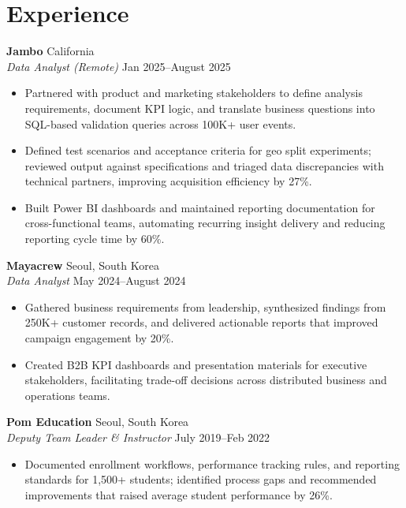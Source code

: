 \documentclass[11pt,a4paper]{article}
\begin{document}
\section*{Experience}
\noindent
\textbf{Jambo} \hfill California \\
\textit{Data Analyst (Remote)} \hfill Jan 2025--August 2025
\begin{itemize}[leftmargin=*, noitemsep, topsep=0pt]
    \item Partnered with product and marketing stakeholders to define analysis requirements, document KPI logic, and translate business questions into SQL-based validation queries across 100K+ user events.
    \item Defined test scenarios and acceptance criteria for geo split experiments; reviewed output against specifications and triaged data discrepancies with technical partners, improving acquisition efficiency by 27\%.
    \item Built Power BI dashboards and maintained reporting documentation for cross-functional teams, automating recurring insight delivery and reducing reporting cycle time by 60\%.
\end{itemize}
\vspace{6pt}

\noindent
\textbf{Mayacrew} \hfill Seoul, South Korea \\
\textit{Data Analyst} \hfill May 2024--August 2024
\begin{itemize}[leftmargin=*, noitemsep, topsep=0pt]
    \item Gathered business requirements from leadership, synthesized findings from 250K+ customer records, and delivered actionable reports that improved campaign engagement by 20\%.
    \item Created B2B KPI dashboards and presentation materials for executive stakeholders, facilitating trade-off decisions across distributed business and operations teams.
\end{itemize}
\vspace{6pt}

\noindent
\textbf{Pom Education} \hfill Seoul, South Korea \\
\textit{Deputy Team Leader \& Instructor} \hfill July 2019--Feb 2022
\begin{itemize}[leftmargin=*, noitemsep, topsep=0pt]
    \item Documented enrollment workflows, performance tracking rules, and reporting standards for 1,500+ students; identified process gaps and recommended improvements that raised average student performance by 26\%.
\end{itemize}
\end{document}
